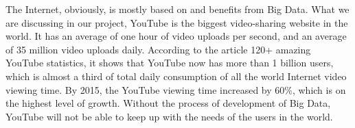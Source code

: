 The Internet, obviously, is mostly based on and benefits from Big Data. What we are discussing in our project, YouTube is the biggest video-sharing website in the world. It has an average of one hour of video uploads per second, and an average of 35 million video uploads daily. According to the article 120+ amazing YouTube statistics, it shows that YouTube now has more than 1 billion users, which is almost a third of total daily consumption of all the world Internet video viewing time. By 2015, the YouTube viewing time increased by 60\%, which is on the highest level of growth. Without the process of development of Big Data, YouTube will not be able to keep up with the needs of the users in the world.
